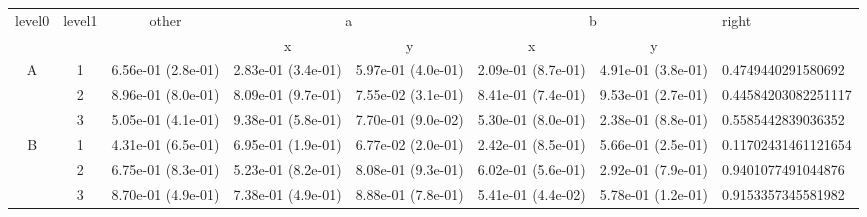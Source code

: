 \begin{tabular}{cccccccl}
\toprule
\multirow{2}{*}{level0} & \multirow{2}{*}{level1}& \multirow{2}{*}{other}&\multicolumn{2}{c}{a}&\multicolumn{2}{c}{b}& \multirow{2}{*}{right}\tabularnewline
\cmidrule(lr){4-5}
\cmidrule(lr){6-7}
&&&x&y&x&y\tabularnewline
\midrule
\multirow{3}{*}{A}&1& 6.56e-01 (2.8e-01)& 2.83e-01 (3.4e-01)& 5.97e-01 (4.0e-01)& 2.09e-01 (8.7e-01)& 4.91e-01 (3.8e-01)& 0.4749440291580692\tabularnewline
&2& 8.96e-01 (8.0e-01)& 8.09e-01 (9.7e-01)& 7.55e-02 (3.1e-01)& 8.41e-01 (7.4e-01)& 9.53e-01 (2.7e-01)& 0.44584203082251117\tabularnewline
&3& 5.05e-01 (4.1e-01)& 9.38e-01 (5.8e-01)& 7.70e-01 (9.0e-02)& 5.30e-01 (8.0e-01)& 2.38e-01 (8.8e-01)& 0.5585442839036352\tabularnewline
\midrule
\multirow{3}{*}{B}&1& 4.31e-01 (6.5e-01)& 6.95e-01 (1.9e-01)& 6.77e-02 (2.0e-01)& 2.42e-01 (8.5e-01)& 5.66e-01 (2.5e-01)& 0.11702431461121654\tabularnewline
&2& 6.75e-01 (8.3e-01)& 5.23e-01 (8.2e-01)& 8.08e-01 (9.3e-01)& 6.02e-01 (5.6e-01)& 2.92e-01 (7.9e-01)& 0.9401077491044876\tabularnewline
&3& 8.70e-01 (4.9e-01)& 7.38e-01 (4.9e-01)& 8.88e-01 (7.8e-01)& 5.41e-01 (4.4e-02)& 5.78e-01 (1.2e-01)& 0.9153357345581982\tabularnewline
\bottomrule
\end{tabular}
